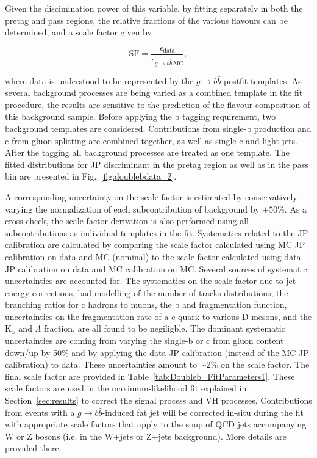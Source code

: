 Given the discimination power of this variable, by fitting separately in both the pretag and pass regions, the relative fractions of the various flavours can be determined, and a scale factor given by 

\begin{equation}
\text{SF}=\frac{\epsilon_{\text{data}}}{\epsilon_{g\to b\bar{b}~\text{MC}}},
\end{equation}

where data is understood to be represented by the $g\to b\bar{b}$ postfit templates.
As several background processes are being varied as a combined template in the fit procedure, the results are sensitive to the prediction of the flavour composition of this background sample. Before applying the b tagging requirement, two background templates are considered. Contributions from single-b production and c from gluon splitting are combined together, as well as single-c and light jets. After the tagging all background processes are treated as one template. The fitted distributions for JP discriminant in the pretag region as well as in the pass bin are presented in Fig.~\ref{fig:doublebdata_2}. 

A corresponding uncertainty on the scale factor is estimated by conservatively varying the normalization of each subcontribution of background by $\pm 50\%$. As a cross check, the scale factor derivation is also performed using all subcontributions as individual templates in the fit. Systematics related to the JP calibration are calculated by comparing the scale factor calculated using MC JP calibration on data and MC (nominal) to the scale factor calculated using data JP calibration on data and MC calibration on MC. Several sources of systematic uncertainties are accounted for. The systematics on the scale factor due to jet energy corrections, bad modelling of the number of tracks distributions, the branching ratios for c hadrons to muons, the b and fragmentation function, uncertainties on the fragmentation rate of a c quark to various D mesons, and the K$_S$ and $\Lambda$ fraction, are all found to be negiligble. The dominant systematic uncertainties are coming from varying the single-b or c from gluon content down/up by 50\% and by applying the data JP calibration (instead of the MC JP calibration) to data. These uncertainties amount to $\sim2\%$ on the scale factor. The final scale factor are provided in Table~\ref{tab:Doubleb_FitParameters1}. These scale factors are used in the maximum-likelihood fit explained in Section~\ref{sec:results} to correct the signal process and VH processes. Contributions from events with a $g\to b\bar{b}$-induced fat jet will be corrected in-situ during the fit with appropriate scale factors that apply to the soup of QCD jets accompanying W or Z bosons (i.e. in the W+jets or Z+jets background). More details are provided there.





